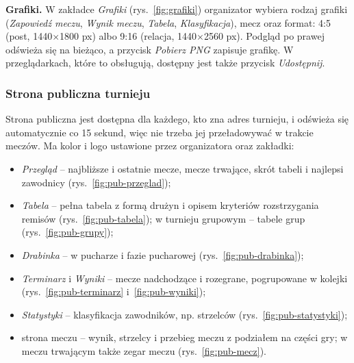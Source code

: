 \documentclass[11pt,a4paper,oneside]{article}
\begin{document}

\textbf{Grafiki.} W zakładce \emph{Grafiki} (rys.~\ref{fig:grafiki}) organizator wybiera rodzaj grafiki (\emph{Zapowiedź meczu}, \emph{Wynik meczu}, \emph{Tabela}, \emph{Klasyfikacja}), mecz oraz format: 4:5 (post, 1440$\times$1800 px) albo 9:16 (relacja, 1440$\times$2560 px). Podgląd po prawej odświeża się na bieżąco, a przycisk \emph{Pobierz PNG} zapisuje grafikę. W przeglądarkach, które to obsługują, dostępny jest także przycisk \emph{Udostępnij}.


\subsubsection*{Strona publiczna turnieju}
Strona publiczna jest dostępna dla każdego, kto zna adres turnieju, i odświeża się automatycznie co 15 sekund, więc nie trzeba jej przeładowywać w trakcie meczów. Ma kolor i logo ustawione przez organizatora oraz zakładki:
\begin{itemize}
\item \emph{Przegląd} -- najbliższe i ostatnie mecze, mecze trwające, skrót tabeli i najlepsi zawodnicy (rys.~\ref{fig:pub-przeglad});
\item \emph{Tabela} -- pełna tabela z formą drużyn i opisem kryteriów rozstrzygania remisów (rys.~\ref{fig:pub-tabela}); w turnieju grupowym -- tabele grup (rys.~\ref{fig:pub-grupy});
\item \emph{Drabinka} -- w pucharze i fazie pucharowej (rys.~\ref{fig:pub-drabinka});
\item \emph{Terminarz} i \emph{Wyniki} -- mecze nadchodzące i rozegrane, pogrupowane w kolejki (rys.~\ref{fig:pub-terminarz} i~\ref{fig:pub-wyniki});
\item \emph{Statystyki} -- klasyfikacja zawodników, np. strzelców (rys.~\ref{fig:pub-statystyki});
\item strona meczu -- wynik, strzelcy i przebieg meczu z podziałem na części gry; w meczu trwającym także zegar meczu (rys.~\ref{fig:pub-mecz}).
\end{itemize}

\end{document}

